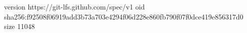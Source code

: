 version https://git-lfs.github.com/spec/v1
oid sha256:f92508f06919add3b73a703e4294f06d228e860fb790f07f0dce419e856317d0
size 11048
